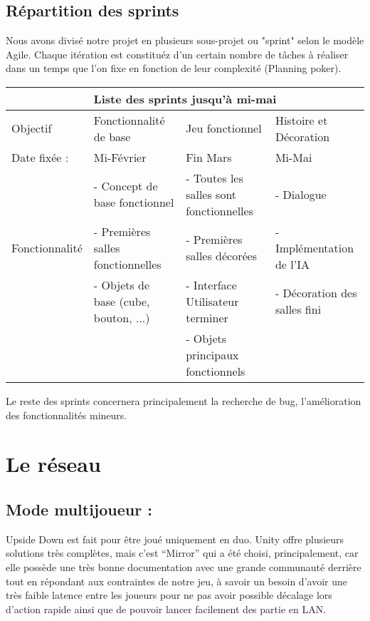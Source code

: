 \documentclass[a4paper,11pt]{article}
\begin{document}
\subsection{Répartition des sprints}

Nous avons divisé notre projet en plusieurs sous-projet ou "sprint" selon le modèle Agile.
Chaque itération est constituéz d'un certain nombre de tâches à réaliser dans un temps que l'on fixe 
en fonction de leur complexité (Planning poker).\newline



\begin{tabular}{ |p{3cm}||p{3cm}|p{3cm}|p{3cm}|  }
 \hline
 \multicolumn{4}{|c|}{Liste des sprints jusqu'à mi-mai} \\
 \hline
 Objectif& Fonctionnalité de base  & Jeu fonctionnel & Histoire et Décoration\\
 \hline
 \hline
 Date fixée : & Mi-Février & Fin Mars & Mi-Mai\\
 \hline
 \multirow{3}{4em}{Fonctionnalité} & - Concept de base fonctionnel & - Toutes les salles sont fonctionnelles & - Dialogue\\ 
 & - Premières salles fonctionnelles & - Premières salles décorées & - Implémentation de l'IA\\ 
 & - Objets de base (cube, bouton, ...) & - Interface Utilisateur terminer & - Décoration des salles fini\\ 
 & & - Objets principaux fonctionnels & \\

 \hline
\end{tabular}


Le reste des sprints concernera principalement la recherche de bug, l'amélioration des 
fonctionnalités mineurs.



\section{Le réseau}

\subsection{Mode multijoueur :} 
	
Upside Down est fait pour être joué uniquement en duo. Unity offre plusieurs solutions très complètes, 
mais c’est “Mirror” qui a été choisi, principalement, car elle possède une très bonne documentation avec une 
grande communauté derrière tout en répondant aux contraintes de notre jeu, à savoir un besoin d’avoir une 
très faible latence entre les joueurs pour ne pas avoir possible décalage lors d’action rapide ainsi 
que de pouvoir lancer facilement des partie en LAN.
\end{document}
